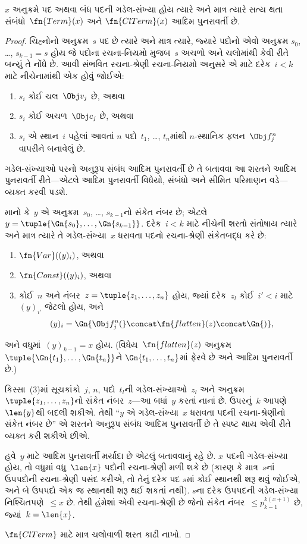 \begin{prop}
$x$ અનુક્રમે પદ અથવા બંધ પદની
ગડેલ-સંખ્યા હોય ત્યારે અને માત્ર ત્યારે
સત્ય થતા સંબંધો~$\fn{Term}(x)$ અને
$\fn{ClTerm}(x)$ આદિમ પુનરાવર્તી છે.
\end{prop}

\begin{proof}
ચિહ્નોનો અનુક્રમ~$s$ પદ છે ત્યારે અને
માત્ર ત્યારે, જ્યારે પદોનો એવો અનુક્રમ
$s_0$, \dots, $s_{k-1} = s$ હોય જે
પદોના રચના-નિયમો મુજબ~$s$ અચળો અને
ચલોમાંથી કેવી રીતે બન્યું તે નોંધે છે.
આવી સંભવિત રચના-શ્રેણી રચના-નિયમો
અનુસરે એ માટે દરેક~$i < k$ માટે
નીચેનામાંથી એક હોવું જોઈએ:
\begin{enumerate}
\item $s_i$ કોઈ ચલ~$\Obj v_j$ છે, અથવા
\item $s_i$ કોઈ અચળ~$\Obj c_j$ છે, અથવા
\item $s_i$ એ સ્થાન~$i$ પહેલાં આવતાં
  $n$ પદો~$t_1$, \dots, $t_n$માંથી
  $n$-સ્થાનિક ફલન~$\Obj f^n_j$
  વાપરીને બનાવેલું છે.
\end{enumerate}
ગડેલ-સંખ્યાઓ પરનો અનુરૂપ સંબંધ આદિમ
પુનરાવર્તી છે તે બતાવવા આ શરતને
આદિમ પુનરાવર્તી રીતે—એટલે આદિમ
પુનરાવર્તી વિધેયો, સંબંધો અને સીમિત
પરિમાણન વડે—વ્યક્ત કરવી પડશે.

માનો કે~$y$ એ અનુક્રમ~$s_0$, \dots,
$s_{k-1}$નો સંકેત નંબર છે; એટલે
$y = \tuple{\Gn{s_0}, \dots, \Gn{s_{k-1}}}$.
દરેક~$i < k$ માટે નીચેની શરતો
સંતોષાય ત્યારે અને માત્ર ત્યારે તે
ગડેલ-સંખ્યા~$x$ ધરાવતા પદનો
રચના-શ્રેણી સંકેતબદ્ધ કરે છે:
\begin{enumerate}
\item $\fn{Var}((y)_i)$, અથવા
\item $\fn{Const}((y)_i)$, અથવા
\item કોઈ~$n$ અને
  નંબર~$z = \tuple{z_1, \dots, z_n}$
  હોય, જ્યાં દરેક~$z_l$ કોઈ~$i' < i$
  માટે~$(y)_{i'}$ જેટલો હોય, અને
\[
(y)_i = \Gn{\Obj f^n_j(} \concat \fn{flatten}(z) \concat \Gn{)},
\]
\end{enumerate}
અને વધુમાં~$(y)_{k-1} = x$ હોય.
(વિધેય~$\fn{flatten}(z)$ અનુક્રમ
$\tuple{\Gn{t_1}, \dots, \Gn{t_n}}$ને
$\Gn{t_1, \dots,
  t_n}$માં ફેરવે છે અને આદિમ પુનરાવર્તી છે.)

કિસ્સા~(3)માં સૂચકાંકો~$j$, $n$, પદો~$t_l$ની
ગડેલ-સંખ્યાઓ~$z_l$ અને
અનુક્રમ~$\tuple{z_1, \dots, z_n}$નો
સંકેત નંબર~$z$—આ બધાં~$y$ કરતાં
નાનાં છે. ઉપરનું~$k$ આપણે~$\len{y}$થી
બદલી શકીએ. તેથી ``$y$ એ ગડેલ-સંખ્યા~$x$
ધરાવતા પદની રચના-શ્રેણીનો સંકેત
નંબર છે'' એ શરતને અનુરૂપ સંબંધ
આદિમ પુનરાવર્તી છે તે સ્પષ્ટ થાય
એવી રીતે વ્યક્ત કરી શકીએ છીએ.

હવે~$y$ માટે આદિમ પુનરાવર્તી મર્યાદા
છે એટલું બતાવવાનું રહે છે. $x$ પદની
ગડેલ-સંખ્યા હોય, તો વધુમાં વધુ~$\len{x}$
પદોની રચના-શ્રેણી મળી શકે છે
(કારણ કે માત્ર~$s$નાં ઉપપદોની રચના-શ્રેણી
પસંદ કરીએ, તો તેનું દરેક પદ
$s$માં કોઈ સ્થાનથી શરૂ થવું જોઈએ,
અને બે ઉપપદો એક જ સ્થાનથી શરૂ
થઈ શકતાં નથી). $s$ના દરેક ઉપપદની
ગડેલ-સંખ્યા નિશ્ચિતપણે~$\le x$ છે.
તેથી હંમેશાં એવી રચના-શ્રેણી છે જેનો
સંકેત નંબર~$\le p_{k-1}^{k(x+1)}$ છે,
જ્યાં~$k=\len{x}$.

$\fn{ClTerm}$ માટે માત્ર
ચલોવાળી શરત કાઢી નાખો.
\end{proof}

